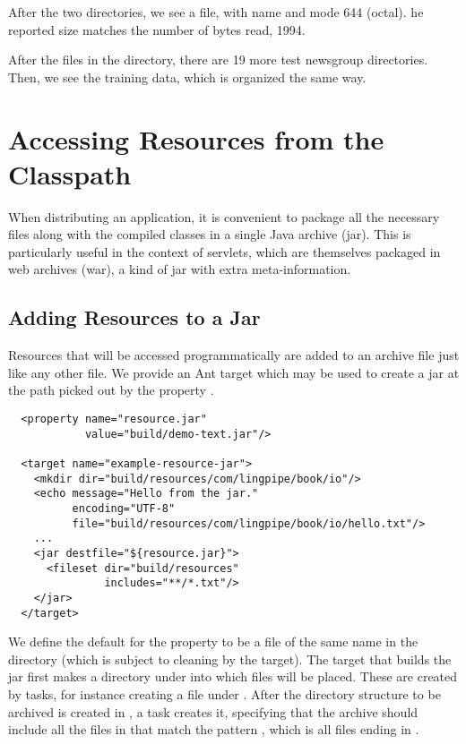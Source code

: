 After the two directories, we see a file, with name
 and mode 644 (octal).  he
reported size matches the number of bytes read, 1994.

After the files in the  directory, there
are 19 more test newsgroup directories.  Then, we see the training
data, which is organized the same way.

\section{Accessing Resources from the Classpath}

When distributing an application, it is convenient to package all the
necessary files along with the compiled classes in a single Java
archive (jar).  This is particularly useful in the context of
servlets, which are themselves packaged in web archives (war), a kind
of jar with extra meta-information.

\subsection{Adding Resources to a Jar}

Resources that will be accessed programmatically are added to an
archive file just like any other file.  We provide an Ant target
 which may be used to create a jar
at the path picked out by the property .  
%
\begin{verbatim}
  <property name="resource.jar"
            value="build/demo-text.jar"/>

  <target name="example-resource-jar">
    <mkdir dir="build/resources/com/lingpipe/book/io"/>
    <echo message="Hello from the jar."
          encoding="UTF-8"
          file="build/resources/com/lingpipe/book/io/hello.txt"/>
    ...
    <jar destfile="${resource.jar}">
      <fileset dir="build/resources" 
               includes="**/*.txt"/>
    </jar>
  </target>
\end{verbatim}
%
We define the default for the property  to be a
file of the same name in the  directory (which is subject
to cleaning by the  target).  The target that builds the
jar first makes a directory under  into which
files will be placed.  These are created by  tasks, for
instance creating a file  under
.  After the directory structure to be archived
is created in , a  task creates it,
specifying that the archive should include all the files in
 that match the pattern , which
is all files ending in .

